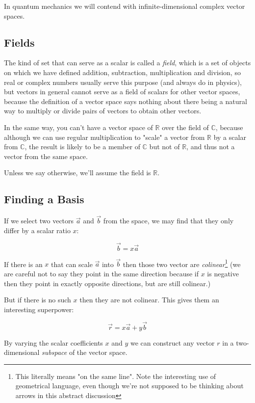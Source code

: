 In quantum mechanics we will contend with infinite-dimensional complex vector spaces.

\subsection{Fields}

The kind of set that can serve as a scalar is called a \textit{field}, which is a set of objects on which we have defined addition, subtraction, multiplication and division, so real or complex numbers usually serve this purpose (and always do in physics), but vectors in general cannot serve as a field of scalars for other vector spaces, because the definition of a vector space says nothing about there being a natural way to multiply or divide pairs of vectors to obtain other vectors.

In the same way, you can't have a vector space of $\mathbb{R}$ over the field of $\mathbb{C}$, because although we can use regular multiplication to "scale" a vector from $\mathbb{R}$ by a scalar from $\mathbb{C}$, the result is likely to be a member of $\mathbb{C}$ but not of $\mathbb{R}$, and thus not a vector from the same space.

Unless we say otherwise, we'll assume the field is $\mathbb{R}$.

\subsection{Finding a Basis}

If we select two vectors $\vec{a}$ and $\vec{b}$ from the space, we may find that they only differ by a scalar ratio $x$:

$$
\vec{b} = x \vec{a}
$$

If there is an $x$ that can scale $\vec{a}$ into $\vec{b}$ then those two vector are \textit{colinear}\footnote{This literally means "on the same line". Note the interesting use of geometrical language, even though we're not supposed to be thinking about arrows in this abstract discussion} (we are careful not to say they point in the same direction because if $x$ is negative then they point in exactly opposite directions, but are still colinear.)

But if there is no such $x$ then they are not colinear. This gives them an interesting superpower:

$$
\vec{r} = x \vec{a} + y \vec{b}
$$

By varying the scalar coefficients $x$ and $y$ we can construct any vector $r$ in a two-dimensional \textit{subspace} of the vector space.

